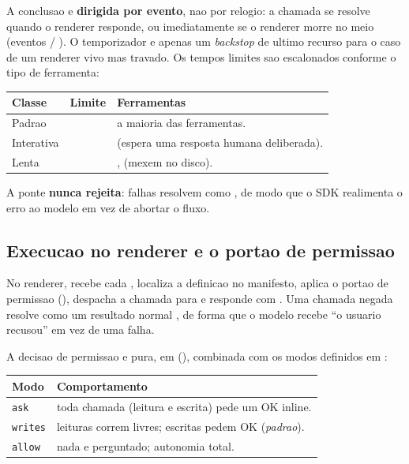A conclusao e \textbf{dirigida por evento}, nao por relogio: a chamada se
resolve quando o renderer responde, ou imediatamente se o renderer morre no meio
(eventos  / ). O temporizador e apenas
um \emph{backstop} de ultimo recurso para o caso de um renderer vivo mas travado.
Os tempos limites sao escalonados conforme o tipo de ferramenta:

\begin{tabularx}{\linewidth}{l l Y}
\toprule
\textbf{Classe} & \textbf{Limite} & \textbf{Ferramentas} \\
\midrule
Padrao       &    & a maioria das ferramentas. \\
Interativa   &  &  (espera uma resposta humana deliberada). \\
Lenta        &    & ,  (mexem no disco). \\
\bottomrule
\end{tabularx}

A ponte \textbf{nunca rejeita}: falhas resolvem como
, de modo que o SDK realimenta o erro ao modelo em
vez de abortar o fluxo.

\subsection{Execucao no renderer e o portao de permissao}

No renderer,  recebe cada ,
localiza a definicao no manifesto, aplica o portao de permissao
(), despacha a chamada para
 e responde com . Uma
chamada negada resolve como um resultado normal
, de forma que o
modelo recebe \enquote{o usuario recusou} em vez de uma falha.

A decisao de permissao e pura, em 
(), combinada com os modos definidos em
:

\begin{tabularx}{\linewidth}{l Y}
\toprule
\textbf{Modo} & \textbf{Comportamento} \\
\midrule
\lstinline|ask|    & toda chamada (leitura e escrita) pede um OK inline. \\
\lstinline|writes| & leituras correm livres; escritas pedem OK (\emph{padrao}). \\
\lstinline|allow|  & nada e perguntado; autonomia total. \\
\bottomrule
\end{tabularx}

